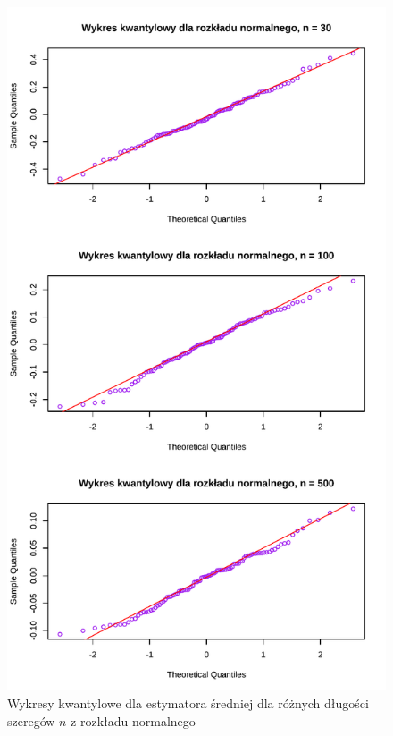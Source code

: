 \documentclass[10pt, a4paper]{article}\usepackage[]{graphicx}\usepackage[]{xcolor}
\makeatletter
\def\maxwidth{ %
  \ifdim\Gin@nat@width>\linewidth
    \linewidth
  \else
    \Gin@nat@width
  \fi
}
\newenvironment{knitrout}{}{} %
\makeatother
\begin{document}
\begin{knitrout}
\color{fgcolor}\begin{figure}[H]

{\centering \includegraphics[width=\maxwidth]{figure/analiza-srednie-wykresy-kwant-1} 

}

\caption[Wykresy kwantylowe dla estymatora średniej dla różnych długości szeregów $n$ z rozkładu normalnego]{Wykresy kwantylowe dla estymatora średniej dla różnych długości szeregów $n$ z rozkładu normalnego}\label{fig:analiza-srednie-wykresy-kwant}
\end{figure}

\end{knitrout}
\end{document}
